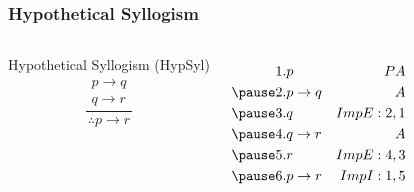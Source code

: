 \documentclass[dvipsnames]{beamer}
\begin{document}
\begin{frame}
  \frametitle{Hypothetical Syllogism}

  \begin{columns}
    \begin{block}{Hypothetical Syllogism (HypSyl)}
      \[
      \frac
        {
          \begin{array}{c}
            p \rightarrow q\\
            q \rightarrow r
          \end{array}}
        {
          \therefore p \rightarrow r
        }
      \]
    \end{block}

    \pause
    \begin{eqnarray*}
      1. & p               & PA\\
      \pause
      2. & p \rightarrow q & A\\
      \pause
      3. & q               & ImpE:2,1\\
      \pause
      4. & q \rightarrow r & A\\
      \pause
      5. & r               & ImpE:4,3\\
      \pause
      6. & p \rightarrow r & ImpI:1,5\\
    \end{eqnarray*}
  \end{columns}
\end{frame}



\end{document}

